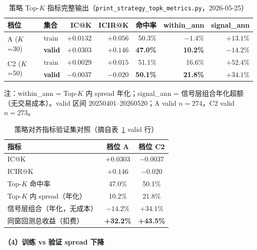 \documentclass[UTF8,a4paper,12pt]{ctexart}
\begin{document}
\begin{table}[H]
\centering
\caption{策略 Top-$K$ 指标完整输出（\texttt{print\_strategy\_topk\_metrics.py}，2026-05-25）}
\label{tab:strategy-topk-full}
\footnotesize
\begin{tabular}{llrrrrr}
\toprule
\textbf{档位} & \textbf{集合} & \textbf{IC@K} & \textbf{ICIR@K} & \textbf{命中率} & \textbf{within\_ann} & \textbf{signal\_ann} \\
\midrule
\multirow{2}{*}{A ($K$=30)}
  & train & $+0.0132$ & $+0.056$ & 50.3\% & $-1.4\%$ & $+13.1\%$ \\
  & \textbf{valid} & $\mathbf{+0.0303}$ & $\mathbf{+0.146}$ & \textbf{47.0\%} & \textbf{10.2\%} & $\mathbf{-14.2\%}$ \\
\midrule
\multirow{2}{*}{C2 ($K$=50)}
  & train & $+0.0029$ & $+0.015$ & 51.1\% & 16.6\% & $+52.4\%$ \\
  & \textbf{valid} & $\mathbf{-0.0037}$ & $\mathbf{-0.020}$ & \textbf{50.1\%} & \textbf{21.8\%} & $\mathbf{+34.1\%}$ \\
\bottomrule
\end{tabular}

\vspace{0.4em}
\small 注：within\_ann = Top-$K$ 内 spread 年化；signal\_ann = 信号层组合年化超额（无交易成本）。valid 区间 20250401--20260520；A valid $n=274$，C2 valid $n=273$。
\end{table}

\begin{table}[H]
\centering
\caption{策略对齐指标验证集对照（摘自表~\ref{tab:strategy-topk-full} valid 行）}
\label{tab:strategy-topk-detail}
\begin{tabular}{lcc}
\toprule
\textbf{指标} & \textbf{档位 A} & \textbf{档位 C2} \\
\midrule
IC@K & $+0.0303$ & $-0.0037$ \\
ICIR@K & $+0.146$ & $-0.020$ \\
Top-$K$ 命中率 & 47.0\% & 50.1\% \\
Top-$K$ 内 spread（年化） & 10.2\% & 21.8\% \\
信号层组合（年化，无成本） & $-14.2\%$ & $+34.1\%$ \\
同窗回测总收益（扣费） & \textbf{+32.2\%} & \textbf{+43.5\%} \\
\bottomrule
\end{tabular}
\end{table}

\paragraph{（4）训练 vs 验证 spread 下降}
\end{document}
